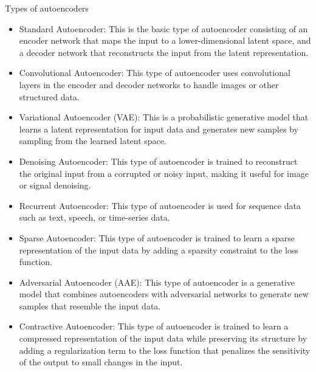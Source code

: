 \begin{frame}{Types of autoencoders}

    \begin{itemize}
        \item
        Standard Autoencoder: 
        This is the basic type of autoencoder consisting of an encoder 
        network that maps the input to a lower-dimensional latent space, 
        and a decoder network that reconstructs the input from the latent representation.
        \item
        Convolutional Autoencoder: This type of autoencoder uses convolutional 
        layers in the encoder and decoder networks to handle images or other structured data.
        \item
        Variational Autoencoder (VAE): This is a probabilistic generative 
        model that learns a latent representation for input data and generates 
        new samples by sampling from the learned latent space.
        \item
        Denoising Autoencoder: This type of autoencoder is trained to 
        reconstruct the original input from a corrupted or noisy input, 
        making it useful for image or signal denoising.
        \item
        Recurrent Autoencoder: This type of autoencoder is used for
        sequence data such as text, speech, or time-series data.
        \item
        Sparse Autoencoder: This type of autoencoder is trained to 
        learn a sparse representation of the input data by adding a 
        sparsity constraint to the loss function.
        \item
        Adversarial Autoencoder (AAE): This type of autoencoder is a 
        generative model that combines autoencoders with adversarial 
        networks to generate new samples that resemble the input data.
        \item
        Contractive Autoencoder: This type of autoencoder is trained 
        to learn a compressed representation of the input data while 
        preserving its structure by adding a regularization term to the 
        loss function that penalizes the sensitivity of the output to small changes in the input.
    \end{itemize}

\end{frame}